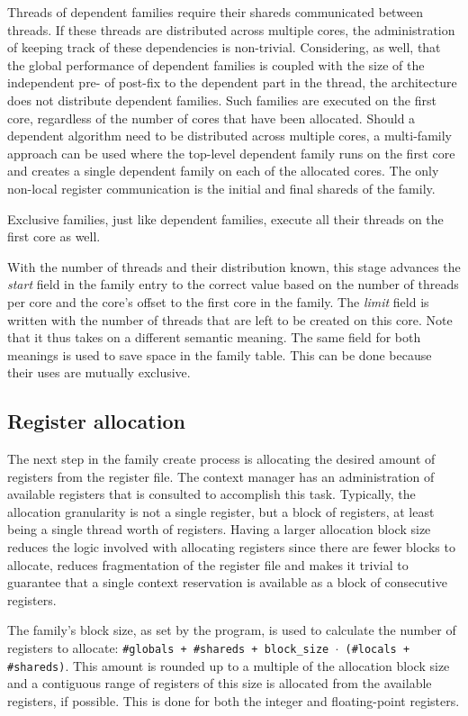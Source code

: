 Threads of dependent families require their shareds communicated between threads. If these threads are distributed across multiple cores, the administration of keeping track of these dependencies is non-trivial. Considering, as well, that the global performance of dependent families is coupled with the size of the independent pre- of post-fix to the dependent part in the thread, the architecture does not distribute dependent families. Such families are executed on the first core, regardless of the number of cores that have been allocated. Should a dependent algorithm need to be distributed across multiple cores, a multi-family approach can be used where the top-level dependent family runs on the first core and creates a single dependent family on each of the allocated cores. The only non-local register communication is the initial and final shareds of the family.

Exclusive families, just like dependent families, execute all their threads on the first core as well.

With the number of threads and their distribution known, this stage advances the \emph{start} field in the family entry to the correct value based on the number of threads per core and the core's offset to the first core in the family. The \emph{limit} field is written with the number of threads that are left to be created on this core. Note that it thus takes on a different semantic meaning. The same field for both meanings is used to save space in the family table. This can be done because their uses are mutually exclusive.

\subsection{\label{sec:register-alloc}Register allocation}
The next step in the family create process is allocating the desired amount of registers from the register file. The context manager has an administration of available registers that is consulted to accomplish this task. Typically, the allocation granularity is not a single register, but a block of registers, at least being a single thread worth of registers. Having a larger allocation block size reduces the logic involved with allocating registers since there are fewer blocks to allocate, reduces fragmentation of the register file and makes it trivial to guarantee that a single context reservation is available as a block of consecutive registers.

The family's block size, as set by the program, is used to calculate the number of registers to allocate: {\tt \#globals + \#shareds + block\_size $\cdot$ (\#locals + \#shareds)}. This amount is rounded up to a multiple of the allocation block size and a contiguous range of registers of this size is allocated from the available registers, if possible. This is done for both the integer and floating-point registers.

